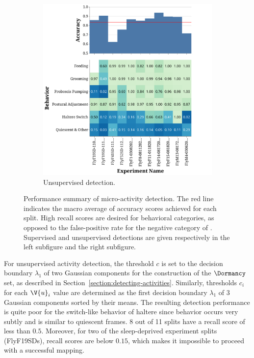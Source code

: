 \begin{figure}[htb!]
\begin{subfigure}[b]{0.495\linewidth}
		\centering\includegraphics[width=\linewidth]{figures/ActivityDetectionPerformance-Unsupervised.pdf}
		\caption{Unsupervised detection.}
	\end{subfigure}%
	\caption[Performance summary of micro-activity detection.]{Performance summary of micro-activity detection.
		The red line indicates the macro average of accuracy scores achieved for each split.
		High recall scores are desired for behavioral categories, as opposed to the false-positive rate for the negative category of \QuiescentOther.
		Supervised and unsupervised detections are given respectively in the left subfigure and the right subfigure. \label{figure:detection-performance}}
\end{figure}

For unsupervised activity detection, the threshold $c$ is set to the decision boundary $\lambda_1$ of two Gaussian components for the construction of the $\Dormancy$ set, as described in Section~\ref{section:detecting-activities}.
Similarly, thresholds $c_i$ for each $\V{u}_i$ value are determined as the first decision boundary $\lambda_1$ of $3$ Gaussian components sorted by their means.
The resulting detection performance is quite poor for the switch-like behavior of haltere since \HaltereSwitch behavior occurs very subtly and is similar to quiescent frames.
8 out of 11 splits have a \HaltereSwitch recall score of less than $0.5$.
Moreover, for two of the sleep-deprived experiment splits (FlyF19SDs), \ProboscisPumping recall scores are below $0.15$, which makes it impossible to proceed with a successful mapping.

